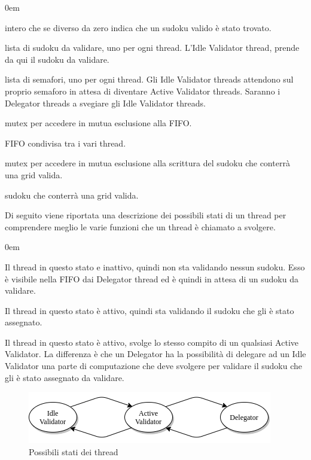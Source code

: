 \documentclass[twoside,twocolumn]{article}
\begin{document}
\begin{description}
	\addtolength{\itemindent}{0.5cm}
	\itemsep0em
	\item [problem\_solved] intero che se diverso da zero indica che un sudoku valido è stato trovato.
	\item [sudokus\_to\_solve] lista di sudoku da validare, uno per ogni thread. L'Idle Validator thread, prende da qui il sudoku da validare.
	\item [semaphores] lista di semafori, uno per ogni thread. Gli Idle Validator threads attendono sul proprio semaforo in attesa di diventare Active Validator threads. Saranno i Delegator threads a svegiare gli Idle Validator threads.
	\item [mutex\_shared\_data] mutex per accedere in mutua esclusione alla FIFO.
	\item [shared\_fifo\_idle\_threads] FIFO condivisa tra i vari thread.
	\item [mutex\_solved\_sudoku] mutex per accedere in mutua esclusione alla scrittura del sudoku che conterrà una grid valida.
	\item [solved\_sudoku] sudoku che conterrà una grid valida.
\end{description}

Di seguito viene riportata una descrizione dei possibili stati di un thread per comprendere meglio le varie funzioni che un thread è chiamato a svolgere.

\begin{description}
	\addtolength{\itemindent}{0.5cm}
	\itemsep0em
	\item [Idle Validator] Il thread in questo stato e inattivo, quindi non sta validando nessun sudoku. Esso è visibile nella FIFO dai Delegator thread ed è quindi in attesa di un sudoku da validare.
	\item [Active Validator] Il thread in questo stato è attivo, quindi sta validando il sudoku che gli è stato assegnato.
	\item [Delegator] Il thread in questo stato è attivo, svolge lo stesso compito di un qualsiasi Active Validator. La differenza è che un Delegator ha la possibilità di delegare ad un Idle Validator una parte di computazione che deve svolgere per validare il sudoku che gli è stato assegnato da validare.
\end{description}
			
\begin{figure}[htp]
\begin{center}
\includegraphics[width=0.45 \textwidth]{stati thread.png}
\caption{Possibili stati dei thread}
\end{center}
\end{figure}
\end{document}
